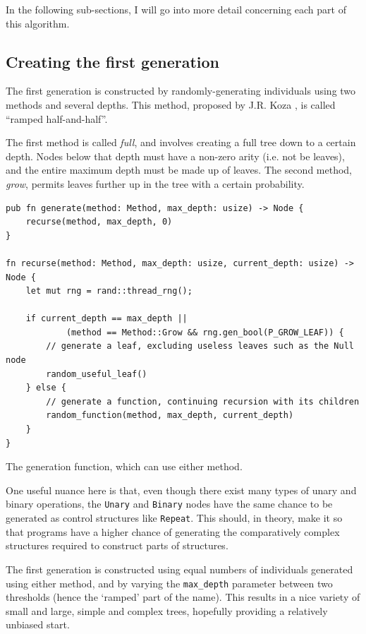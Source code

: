 \documentclass{report}
\newenvironment{code}{\captionsetup{type=listing}}{}
\begin{document}
In the following sub-sections, I will go into more detail concerning each part of this algorithm.

\subsection{Creating the first generation}

The first generation is constructed by randomly-generating individuals using two methods and several depths. This method, proposed by J.R. Koza \cite{koza}, is called ``ramped half-and-half''.

The first method is called \emph{full}, and involves creating a full tree down to a certain depth. Nodes below that depth must have a non-zero arity (i.e. not be leaves), and the entire maximum depth must be made up of leaves. The second method, \emph{grow}, permits leaves further up in the tree with a certain probability.

\begin{code}
    \begin{verbatim}
pub fn generate(method: Method, max_depth: usize) -> Node {
    recurse(method, max_depth, 0)
}

fn recurse(method: Method, max_depth: usize, current_depth: usize) -> Node {
    let mut rng = rand::thread_rng();

    if current_depth == max_depth || 
            (method == Method::Grow && rng.gen_bool(P_GROW_LEAF)) {
        // generate a leaf, excluding useless leaves such as the Null node
        random_useful_leaf()
    } else {
        // generate a function, continuing recursion with its children
        random_function(method, max_depth, current_depth)
    }
}
    \end{verbatim}
    \caption{The generation function, which can use either method.}
    \label{lst:gen_function}
\end{code}

One useful nuance here is that, even though there exist many types of unary and binary operations, the \verb|Unary| and \verb|Binary| nodes have the same chance to be generated as control structures like \verb|Repeat|. This should, in theory, make it so that programs have a higher chance of generating the comparatively complex structures required to construct parts of structures.

The first generation is constructed using equal numbers of individuals generated using either method, and by varying the \verb|max_depth| parameter between two thresholds (hence the `ramped' part of the name). This results in a nice variety of small and large, simple and complex trees, hopefully providing a relatively unbiased start.
\end{document}

